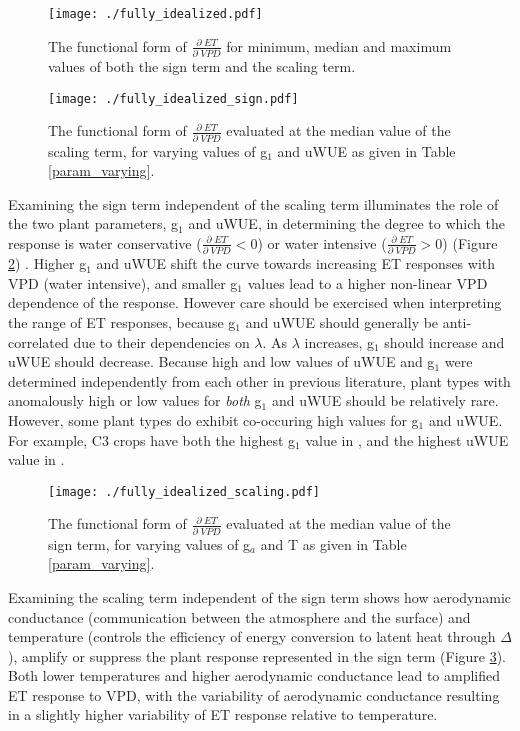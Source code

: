 \begin{figure}
  \centering \texttt{[image: ./fully\_idealized.pdf]}
  \caption{The functional form of $\frac{\partial \; ET}{\partial
      \; VPD}$ for minimum, median and maximum values of both the sign
    term and the scaling term.}
  \label{full}
\end{figure}

\begin{figure}
  \centering \texttt{[image: ./fully\_idealized\_sign.pdf]}
  \caption{The functional form of $\frac{\partial \; ET}{\partial
      \; VPD}$ evaluated at the median value of the scaling term, for
    varying values of g$_1$ and uWUE as given in Table \ref{param_varying}.}
  \label{sign}
\end{figure}

Examining the sign term independent of the scaling term illuminates
the role of the two plant parameters, g$_1$ and uWUE, in determining
the degree to which the response is water conservative
($\frac{\partial \; ET}{\partial \; VPD} < 0$) or water intensive
($\frac{\partial \; ET}{\partial \; VPD} > 0$) (Figure \ref{sign})
. Higher g$_1$ and uWUE shift the curve towards increasing ET
responses with VPD (water intensive), and smaller g$_1$ values lead to
a higher non-linear VPD dependence of the response. However care
should be exercised when interpreting the range of ET responses,
because g$_1$ and uWUE should generally be anti-correlated due to
their dependencies on $\lambda$. As $\lambda$ increases, g$_1$ should
increase and uWUE should decrease. Because high and low values of uWUE
and g$_1$ were determined independently from each other in previous
literature, plant types with anomalously high or low values for
\textit{both} g$_1$ and uWUE should be relatively rare. However, some
plant types do exhibit co-occuring high values for g$_1$ and uWUE. For
example, C3 crops have both the highest g$_1$ value in
, and the highest uWUE value in .

\begin{figure}
  \centering \texttt{[image: ./fully\_idealized\_scaling.pdf]}
  \caption{The functional form of $\frac{\partial \; ET}{\partial
      \; VPD}$ evaluated at the median value of the sign term, for
    varying values of g$_a$ and T as given in Table \ref{param_varying}.}
  \label{scaling}
\end{figure}

Examining the scaling term independent of the sign term shows how
aerodynamic conductance (communication between the atmosphere and the
surface) and temperature (controls the efficiency of energy conversion
to latent heat through $\Delta$), amplify or suppress the plant
response represented in the sign term (Figure \ref{scaling}). Both
lower temperatures and higher aerodynamic conductance lead to
amplified ET response to VPD, with the variability of aerodynamic
conductance resulting in a slightly higher variability of ET response
relative to temperature.

